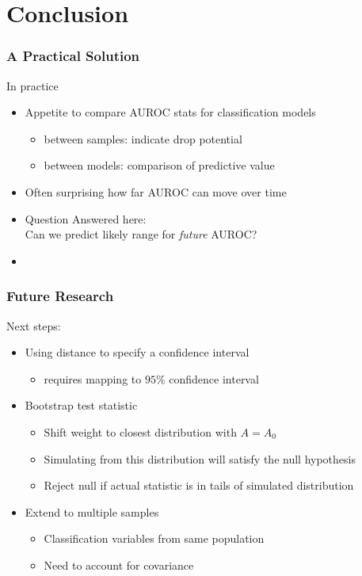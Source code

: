 \documentclass{beamer}
\begin{document}


\section{Conclusion}



\begin{frame}
\frametitle{A Practical Solution}

In practice
\begin{itemize}
    \item Appetite to compare AUROC stats for classification models
    \begin{itemize}
        \item between samples: indicate drop potential
        \item between models: comparison of predictive value
    \end{itemize}
    \item Often surprising how far AUROC can move over time 
    \item Question Answered here: \\
        Can we predict likely range for \emph{future} AUROC?
    \item 
\end{itemize}

\end{frame}


\begin{frame}
\frametitle{Future Research}

Next steps: 
\begin{itemize}
    \item Using distance to specify a confidence interval
    \begin{itemize}
        \item requires mapping to $95\%$ confidence interval
    \end{itemize}
    \item Bootstrap test statistic
    \begin{itemize}
        \item Shift weight to closest distribution with $A = A_0$
        \item Simulating from this distribution will satisfy the null hypothesis
        \item Reject null if actual statistic is in tails of simulated distribution
    \end{itemize}
    \item Extend to multiple samples
    \begin{itemize}
        \item Classification variables from same population
        \item Need to account for covariance
    \end{itemize}
\end{itemize}

\end{frame}




\end{document}
